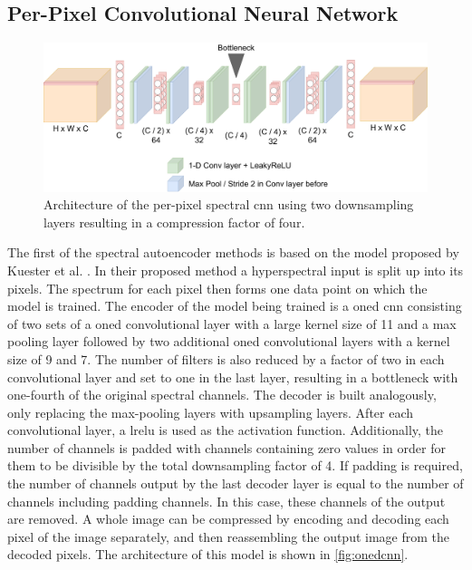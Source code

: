 \subsection{Per-Pixel Convolutional Neural Network\label{sec:conv1d}}
\begin{figure}
\centering
\includegraphics[scale=0.18]{img/OneDCNN.pdf}
\caption[Per-Pixel Spectral \Ac{cnn}]{Architecture of the per-pixel spectral \ac{cnn} \citep{kuester_1d-convolutional_2021} using two downsampling layers resulting in a compression factor of four.}
\label{fig:onedcnn}
\end{figure}
The first of the spectral autoencoder methods is based on the model proposed by Kuester et al. \citep{kuester_1d-convolutional_2021,kuester_transferability_2022}. In their proposed method a hyperspectral input is split up into its pixels. The spectrum for each pixel then forms one data point on which the model is trained. The encoder of the model being trained is a \ac{oned} \ac{cnn} consisting of two sets of a \ac{oned} convolutional layer with a large kernel size of 11 and a max pooling layer followed by two additional \ac{oned} convolutional layers with a kernel size of 9 and 7. The number of filters is also reduced by a factor of two in each convolutional layer and set to one in the last layer, resulting in a bottleneck with one-fourth of the original spectral channels. The decoder is built analogously, only replacing the max-pooling layers with upsampling layers. After each convolutional layer, a \ac{lrelu} is used as the activation function. Additionally, the number of channels is padded with channels containing zero values in order for them to be divisible by the total downsampling factor of 4. If padding is required, the number of channels output by the last decoder layer is equal to the number of channels including padding channels. In this case, these channels of the output are removed. A whole image can be compressed by encoding and decoding each pixel of the image separately, and then reassembling the output image from the decoded pixels. The architecture of this model is shown in \autoref{fig:onedcnn}.

